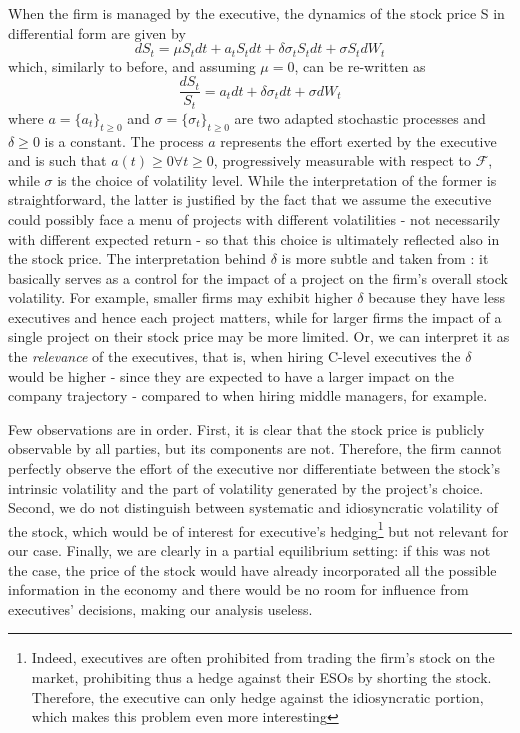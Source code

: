 When the firm is managed by the executive, the dynamics of the stock price S in differential form are given by 
$$ dS_t = \mu S_t dt + a_t S_t dt + \delta \sigma_t S_t dt + \sigma S_t dW_t $$
which, similarly to before, and assuming $\mu = 0$, can be re-written as 
$$ \frac{dS_t}{S_t} = a_t dt + \delta \sigma_t dt + \sigma dW_t $$
where $a = \{a_t\}_{t \ge 0}$ and $\sigma = \{\sigma_t\}_{t \ge 0}$ are two adapted stochastic processes and $\delta \ge 0$ is a constant. The process $a$ represents the effort exerted by the executive and is such that $a(t) \ge 0 \forall t \ge 0$, progressively measurable with respect to $\mathscr{F}$, while $\sigma$ is the choice of volatility level. While the interpretation of the former is straightforward, the latter is justified by the fact that we assume the executive could possibly face a menu of projects with different volatilities - not necessarily with different expected return - so that this choice is ultimately reflected also in the stock price. 
The interpretation behind $\delta$ is more subtle and taken from \cite{cadenillas2005executive}: it basically serves as a control for the impact of a project on the firm's overall stock volatility. For example, smaller firms may exhibit higher $\delta$ because they have less executives and hence each project matters, while for larger firms the impact of a single project on their stock price may be more limited. Or, we can interpret it as the \textit{relevance} of the executives, that is, when hiring C-level executives the $\delta$ would be higher - since they are expected to have a larger impact on the company trajectory - compared to when hiring middle managers, for example.

Few observations are in order. First, it is clear that the stock price is publicly observable by all parties, but its components are not. Therefore, the firm cannot perfectly observe the effort of the executive nor differentiate between the stock's intrinsic volatility and the part of volatility generated by the project's choice. Second, we do not distinguish between systematic and idiosyncratic volatility of the stock, which would be of interest for executive's hedging\footnote{Indeed, executives are often prohibited from trading the firm's stock on the market, prohibiting thus a hedge against their ESOs by shorting the stock. Therefore, the executive can only hedge against the idiosyncratic portion, which makes this problem even more interesting} but not relevant for our case. Finally, we are clearly in a partial equilibrium setting: if this was not the case, the price of the stock would have already incorporated all the possible information in the economy and there would be no room for influence from executives' decisions, making our analysis useless.


